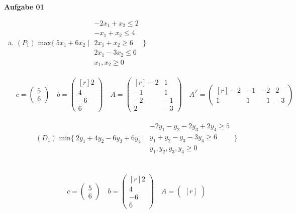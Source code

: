 \documentclass[a4paper,10pt]{article}
\begin{document}
	\parindent0pt
	\textbf{Aufgabe 01}\\
	\begin{enumerate}[a)]
	\item 
	$(P_1) \text{ max} \{\ 5x_1 + 6x_2 \mid 
	\begin{matrix}
		-2x_1 + x_2 \leq 2\\
		-x_1 + x_2 \leq 4\\
		2x_1 + x_2 \geq 6\\
		2x_1 - 3x_2 \leq 6\\
		x_1, x_2 \geq 0
	\end{matrix}
	\ \}$
	\\\\
	\[
	c = 
	\begin{pmatrix}
		5\\
		6
	\end{pmatrix}
	\quad
	b = 
	\begin{pmatrix*}[r]
		2\\
		4\\
		-6\\
		6
	\end{pmatrix*}
	\quad
	A =
	\begin{pmatrix*}[r]
		-2 & 1\\
		-1 & 1\\
		-2 & -1\\
		2 & -3
	\end{pmatrix*}
	\quad
	A^T = 
	\begin{pmatrix*}[r]
		-2 & -1 & -2 & 2\\
		1 & 1 & -1 & -3
	\end{pmatrix*}
	\]
	\ \\
	\[
	(D_1) \text{ min} \{\ 2y_1 + 4y_2 -6y_3 +6y_4 \mid 
	\begin{matrix}
		-2y_1 - y_2 -2y_3 + 2y_4 \geq 5\\
		y_1 + y_2 -y_3 -3y_4 \geq 6\\
		y_1, y_2, y_3, y_4 \geq 0
	\end{matrix}
	\ \}
	\]
	\\\\
	\[
	c = 
	\begin{pmatrix}
	5\\
	6
	\end{pmatrix}
	\quad
	b = 
	\begin{pmatrix*}[r]
	2\\
	4\\
	-6\\
	6
	\end{pmatrix*}
	\quad
	A = 
	\begin{pmatrix*}[r]

\end{pmatrix*}\]
\end{enumerate}
\end{document}
